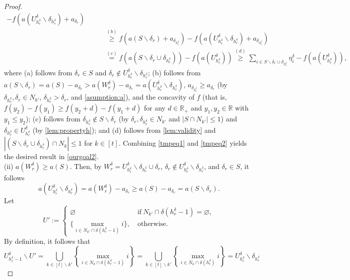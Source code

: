 \documentclass[10pt,a4paper]{amsart}
\newcommand{\D}{\delta}
\newcommand{\R}{\mathbb{R}}
\begin{document}
\begin{proof}
\begin{equation}
\begin{aligned}
	 		-f(a(U^{\D}_{h^\D_r}\backslash \D_{h^\D_r})+a_{\D_r})\\
	 		&\qquad \stackrel{(b)}{\geq} f(a(S\backslash \D_r)+a_{\D_{h^\D_r}})
	 		-f(a(U^{\D}_{h^\D_r}\backslash \D_{h^\D_r})+a_{\D_{h^\D_r}}) \\
	 		&\qquad \stackrel{(c)}{=}f(a(S\backslash \D_r\cup\D_{h^\D_r}))
	 		-f(a(U^{\D}_{h^\D_r}))\stackrel{(d)}{\geq} \sum_{i\in S\backslash \D_r\cup\D_{h^\D_r}}
	 		\eta^{\D}_i-f(a(U^{\D}_{h^\D_r})),
	 	\end{aligned}
	 \end{equation}
	 where (a) follows from $\D_r\in S$ and $\D_r\notin U^\D_{h^\D_r}\backslash \D_{h^\D_r}$; 
	 (b) follows from  $a(S\backslash \D_r)= a(S)-a_{\D_r}> 
	 a(W^{\D}_r)-a_{\D_r}= a(U^{\D}_{h^\D_r}\backslash\D_{h^\D_r})$,
	 $a_{\D_{h^\D_r}}\geq a_{\D_r}$ (by $\D_{h^\D_r},\D_r\in N_{k'}$, $\D_{h^\D_r}> \D_{r}$, 
	 and \eqref{asumption:a}), and the concavity of $f$ (that is, $f(y_2)-f(y_1)\geq f(y_2+d)-f(y_1+d)$ for any $d\in\R_+$ and $y_1,y_2\in\R$ with $y_1\leq y_2$);
	 (c) follows from $\D_{h^\D_r}\notin S\backslash \D_r$ 
	 (by $\D_r,\D_{h^\D_r}\in N_{k'}$ and $|S \cap N_{k'}|\leq 1$)
	 and $\D_{h^\D_r}\in U^{\D}_{h^\D_r}$ (by \cref{lem:propertyh});
	 and (d) follows from \cref{lem:validity} and $|(S\backslash \D_r\cup \D_{h^\D_r})\cap N_k|\leq 1$ for $k \in [t]$.
	 Combining \eqref{tmpeq1} and \eqref{tmpeq2} yields the desired result in \eqref{ourgoal2}.\\[8pt]
	{(ii)} $a(W^{\D}_r)\geq a(S)$.
	Then, by $W_r^\D= U^\D_{ h^\D_r}\backslash \D_{h^\D_r}\cup \D_r$, $\D_r \notin U^\D_{ h^\D_r}\backslash \D_{h^\D_r}$, and $\D_r \in S$, it follows
	\begin{equation}\label{tmpeq3}
		a(U^\D_{h^\D_r}\backslash\D_{h^\D_r})
		= a(W^\D_r)-a_{\D_r}\geq a(S)-a_{\D_r}= a(S\backslash \D_r).
	\end{equation}
	Let
	\begin{equation}\label{defU'}
		U':=
		\begin{cases}
			\varnothing & 
			~\text{if}~  N_{k'}\cap\D(h^\D_r-1)=\varnothing,\\
			\{\max_{i\in N_{k'}\cap\D(h^\D_r-1)}i\},
			& ~\text{otherwise}.
		\end{cases}
	\end{equation}
	By definition, it follows that
	\begin{equation}\label{J'-1J'}
		U^\D_{h^\D_r-1}\backslash U'= \bigcup_{k\in [t]\backslash k'}
		\left\{\max_{i\in N_k\cap\D(h^\D_r-1)}i\right\}= \bigcup_{k\in [t]\backslash k'}
		\left\{\max_{i\in N_k\cap\D(h^\D_r)}i\right\}=U^\D_{h^\D_r}\backslash \D_{h^\D_r}

\end{equation}
\end{proof}
\end{document}

